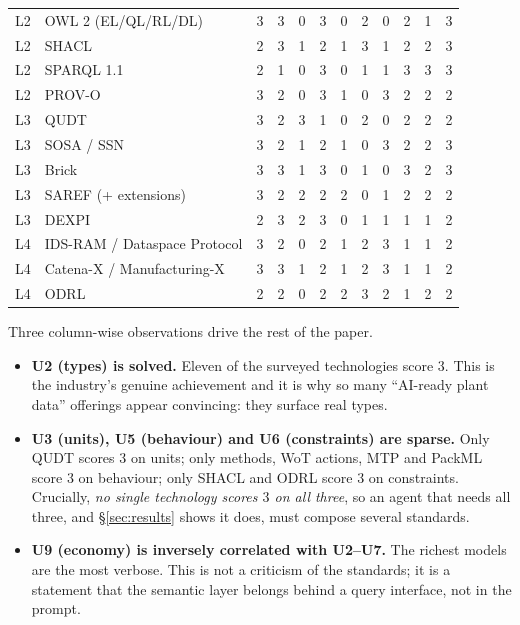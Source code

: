 \begin{table}[t]
{\begin{tabular}{@{}llcccccccccc@{}}
L2 & OWL 2 (EL/QL/RL/DL)               & 3 & 3 & 0 & 3 & 0 & 2 & 0 & 2 & 1 & 3 \\
L2 & SHACL                             & 2 & 3 & 1 & 2 & 1 & 3 & 1 & 2 & 2 & 3 \\
L2 & SPARQL 1.1                        & 2 & 1 & 0 & 3 & 0 & 1 & 1 & 3 & 3 & 3 \\
L2 & PROV-O                            & 3 & 2 & 0 & 3 & 1 & 0 & 3 & 2 & 2 & 2 \\
\midrule
L3 & QUDT                              & 3 & 2 & 3 & 1 & 0 & 2 & 0 & 2 & 2 & 2 \\
L3 & SOSA / SSN                        & 3 & 2 & 1 & 2 & 1 & 0 & 3 & 2 & 2 & 3 \\
L3 & Brick                             & 3 & 3 & 1 & 3 & 0 & 1 & 0 & 3 & 2 & 3 \\
L3 & SAREF (+ extensions)              & 3 & 2 & 2 & 2 & 2 & 0 & 1 & 2 & 2 & 2 \\
L3 & DEXPI                             & 2 & 3 & 2 & 3 & 0 & 1 & 1 & 1 & 1 & 2 \\
\midrule
L4 & IDS-RAM / Dataspace Protocol      & 3 & 2 & 0 & 2 & 1 & 2 & 3 & 1 & 1 & 2 \\
L4 & Catena-X / Manufacturing-X        & 3 & 3 & 1 & 2 & 1 & 2 & 3 & 1 & 1 & 2 \\
L4 & ODRL                              & 2 & 2 & 0 & 2 & 2 & 3 & 2 & 1 & 2 & 2 \\
\bottomrule
\end{tabular}}
\end{table}

Three column-wise observations drive the rest of the paper.

\begin{itemize}
  \item \textbf{U2 (types) is solved.} Eleven of the surveyed technologies score
  $3$. This is the industry's genuine achievement and it is why so many
  ``AI-ready plant data'' offerings appear convincing: they surface real types.
  \item \textbf{U3 (units), U5 (behaviour) and U6 (constraints) are sparse.}
  Only QUDT scores $3$ on units; only \opcua{} methods, WoT actions, MTP and
  PackML score $3$ on behaviour; only SHACL and ODRL score $3$ on constraints.
  Crucially, \emph{no single technology scores $3$ on all three}, so an agent
  that needs all three, and \S\ref{sec:results} shows it does, must
  compose several standards.
  \item \textbf{U9 (economy) is inversely correlated with U2--U7.} The richest
  models are the most verbose. This is not a criticism of the standards; it is a
  statement that the semantic layer belongs behind a query interface, not in the
  prompt.
\end{itemize}

